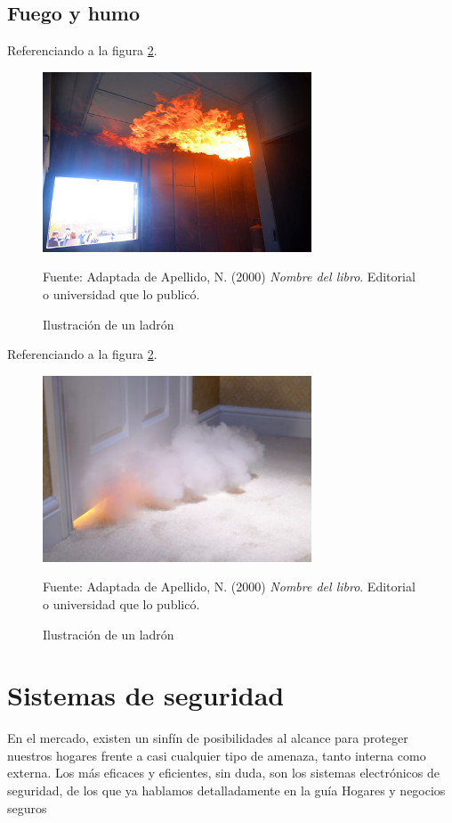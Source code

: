 \subsection{Fuego y humo}
Referenciando a la figura \ref{fig:ejemplo}.
\begin{figure}[H]
    \begin{center}
        \includegraphics[width=8cm]{img/capitulo_3/fuego_en_interiores.jpg}
    \end{center}
    \caption{Ilustración de un ladrón}
    Fuente: Adaptada de Apellido, N. (2000) \textit{Nombre del libro}.
    Editorial o universidad que lo publicó.
    \label{fig:ejemplo}
\end{figure}

Referenciando a la figura \ref{fig:ejemplo}.
\begin{figure}[H]
    \begin{center}
        \includegraphics[width=8cm]{img/capitulo_3/fuego_en_el_cuarto.jpg}
    \end{center}
    \caption{Ilustración de un ladrón}
    Fuente: Adaptada de Apellido, N. (2000) \textit{Nombre del libro}.
    Editorial o universidad que lo publicó.
    \label{fig:ejemplo}
\end{figure}

\section{Sistemas de seguridad}
En el mercado, existen un sinfín de posibilidades al alcance para proteger nuestros hogares frente a casi cualquier tipo de amenaza, tanto interna como externa. Los más eficaces y eficientes, sin duda, son los sistemas electrónicos de seguridad, de los que ya hablamos detalladamente en la guía Hogares y negocios seguros\\

